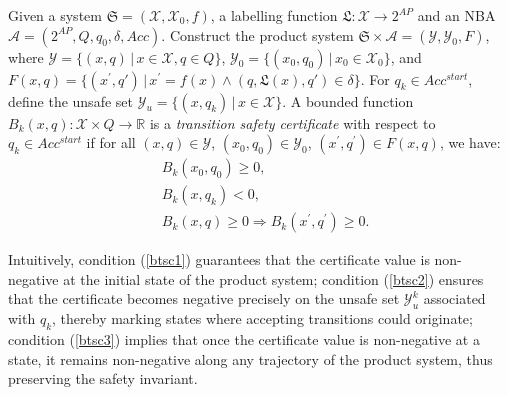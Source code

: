 \begin{definition}
  \label{transition-safety-certificate-definition}
  Given a system $\mathfrak{S} = (\mathcal{X}, \mathcal{X}_0, f)$, a labelling function $\mathfrak{L}:\mathcal{X} \rightarrow 2^{AP}$ and an NBA $\mathcal{A} = (2^{AP}, Q, q_0, \delta, Acc)$. Construct the product system $\mathfrak{S} \times \mathcal{A} = (\mathcal{Y}, \mathcal{Y}_0, F)$, where $\mathcal{Y} = \{(x, q) \,|\, x \in \mathcal{X}, q \in Q \}$, $\mathcal{Y}_0 = \{ (x_0, q_0) \,|\, x_0 \in \mathcal{X}_0 \}$, and $F(x,q) = \{(x^{\prime}, q') \,|\, x^{\prime} = f(x) \land (q, \mathfrak{L}(x), q') \in \delta\}$. For $q_k \in Acc^{start}$, define the unsafe set $\mathcal{Y}_u = \{(x, q_k) \,|\, x \in \mathcal{X}\}$. A bounded function $B_{k}(x, q): \mathcal{X} \times Q \rightarrow \mathbb{R}$ is a \emph{transition safety certificate} with respect to $q_k \in Acc^{start}$ if for all $(x,q) \in \mathcal{Y}$, $(x_0, q_0) \in \mathcal{Y}_0$, $(x^{\prime}, q^{\prime}) \in F(x, q)$, we have:
  \begin{align}
    &B_{k}(x_0, q_0) \geq 0, \label{btsc1} \\
    &B_{k}(x, q_k) < 0, \label{btsc2} \\
    &B_{k}(x, q) \geq 0 \Rightarrow B_{k}(x^{\prime}, q^{\prime}) \geq 0. \label{btsc3}
  \end{align}
\end{definition}


Intuitively, condition (\ref{btsc1}) guarantees that the certificate value is non-negative at the initial state of the product system; condition (\ref{btsc2}) ensures that the certificate becomes negative precisely on the unsafe set $\mathcal{Y}_u^k$ associated with $q_k$, thereby marking states where accepting transitions could originate; condition (\ref{btsc3}) implies that once the certificate value is non-negative at a state, it remains non-negative along any trajectory of the product system, thus preserving the safety invariant.

